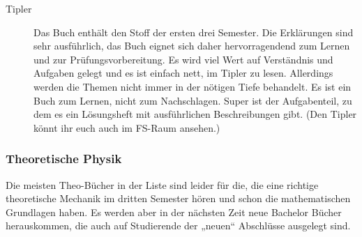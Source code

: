 \begin{description}

\item[Tipler]{
Das Buch enthält den Stoff der ersten drei Semester. Die Erklärungen
sind
sehr ausführlich, das Buch eignet sich daher hervorragendend zum
Lernen und
zur Prüfungsvorbereitung. Es wird viel Wert auf Verständnis und
Aufgaben
gelegt und es ist einfach nett, im Tipler zu lesen. Allerdings werden
die
Themen nicht immer in der nötigen Tiefe behandelt. Es ist ein
Buch zum Lernen, nicht zum Nachschlagen. Super ist der Aufgabenteil,
zu dem es
ein Lösungsheft mit ausführlichen Beschreibungen gibt. (Den Tipler
könnt ihr euch auch
im FS-Raum ansehen.)}

\end{description}

\subsubsection*{Theoretische Physik}

Die meisten Theo-Bücher in der Liste sind leider für die, die eine
richtige theoretische
Mechanik im dritten Semester hören und schon die mathematischen
Grundlagen haben. Es werden
aber in der nächsten Zeit neue Bachelor Bücher herauskommen, die
auch auf Studierende der
„neuen“ Abschlüsse ausgelegt sind.


